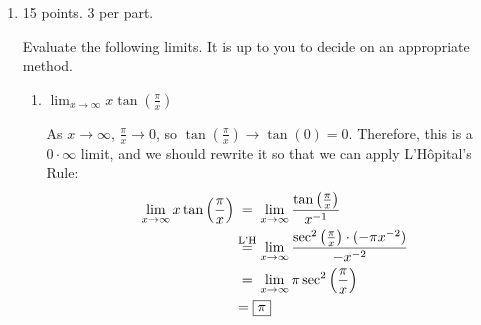 \documentclass{article}
\begin{document}
\begin{enumerate}
\item 

\begin{grading}
15 points. 3 per part.
\end{grading}

Evaluate the following limits.  It is up to you to decide on an
  appropriate method.

  \probonly{ \raggedcolumns}
    \begin{enumerate}

    \item
      \begin{problem}[\vfill]
        $\displaystyle \lim_{x \to \infty } x \tan \left(\frac{\pi}{x}
        \right)$
      \end{problem}

      \begin{solution} 
        As $x \to \infty$, $\frac{\pi}{x} \to 0$, so $\tan \left(
          \frac{\pi}{x} \right) \to \tan (0) = 0$.  Therefore, this is a
        $0 \cdot \infty$ limit, and we should rewrite it so that we can
        apply L'H\^opital's Rule:
        \begin{align*}
          \lim_{x \to \infty } x \tan \left(\frac{\pi}{x}
          \right) & \nolheq 
          \lim_{x \to \infty} \frac{\tan \left( \frac{\pi}{x}
            \right)}{x^{-1}} \\
          & \lheq  \lim_{x \to \infty}
          \frac{\sec^2 \left( \frac{\pi}{x} \right) \cdot (-\pi x^{-2})
          }{-x^{-2}} 
          \\ 
          &\nolheq \lim_{x \to \infty} \pi \sec^2 \left( \frac{\pi}{x}
          \right) \\
          &= \boxed{\pi}
        \end{align*}
      \end{solution}






\end{enumerate}
\end{enumerate}
\end{document}
